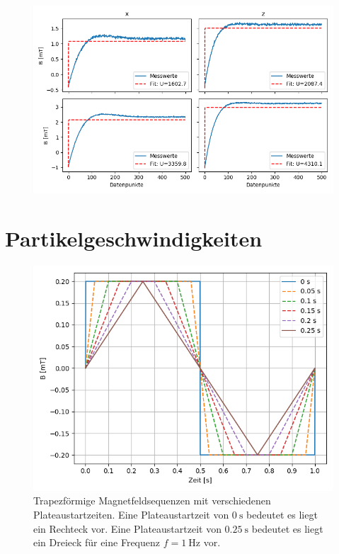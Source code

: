 \documentclass[page,pdftex,12pt,a4paper,twoside,openright]{scrbook}
\begin{document}
\begin{figure}[h]
\centering
\includegraphics[width=\textwidth]{img/mag_fit.png}
\label{fig-mag_fit}
\end{figure}

\section{Partikelgeschwindigkeiten \label{sec-partikelgeschwindigkeiten}}
\label{sec:orgec47d38}
\blindtext

\begin{figure}[h]
\centering
\includegraphics[width=\textwidth]{./img/plateau.png}
\caption{\label{fig-plateau}
Trapezförmige Magnetfeldsequenzen mit verschiedenen Plateaustartzeiten. Eine Plateaustartzeit von \(\SI{0}{\s}\) bedeutet es liegt ein Rechteck vor. Eine Plateaustartzeit von \(\SI{0.25}{\s}\) bedeutet es liegt ein Dreieck für eine Frequenz \(f = \SI{1}{\hertz}\) vor.}
\end{figure}
\end{document}
